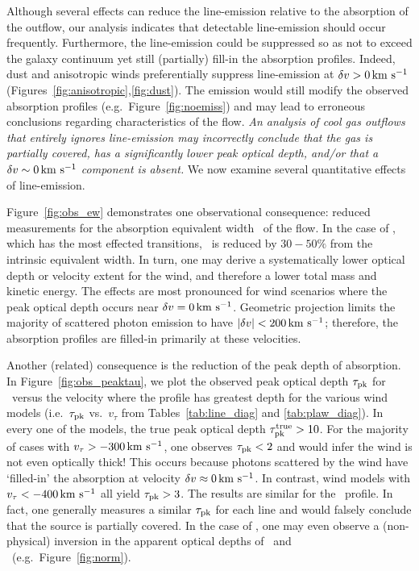 \documentclass[12pt,preprint]{aastex}
\begin{document}
Although several effects can reduce the line-emission
relative to the absorption of the outflow, our analysis
indicates that detectable line-emission should occur frequently. 
Furthermore, the line-emission could be suppressed so as not to exceed
the galaxy continuum yet still (partially) fill-in the absorption
profiles. Indeed, dust and anisotropic winds preferentially suppress
line-emission at $\delta v > 0 \, {\rm km~s^{-1}}$
(Figures~\ref{fig:anisotropic},\ref{fig:dust}).
The emission would still 
modify the observed absorption profiles (e.g.\
Figure~\ref{fig:noemiss}) and may lead to erroneous conclusions
regarding characteristics of the flow.  {\it An analysis of cool gas outflows
that entirely ignores line-emission may incorrectly conclude that the gas is
partially covered, has a significantly lower peak optical depth,
and/or that a $\delta v \sim 0 \, {\rm km~s^{-1}}$ component is
absent.}  
We now examine several quantitative effects of line-emission.

Figure~\ref{fig:obs_ew} demonstrates one observational
consequence: reduced measurements for the absorption
equivalent width \ewabs\ of the flow.  In the case of ,
which has the most effected transitions, \ewabs\ is reduced by
$30-50\%$ from the intrinsic equivalent width.  In turn, one may derive 
a systematically lower optical depth or velocity extent for the wind,
and therefore a lower total mass and kinetic energy.  
The effects are most pronounced for wind
scenarios where the peak optical depth occurs near $\delta v = 0 \, {\rm km~s^{-1}}$.
Geometric projection limits the majority of scattered photon emission to
have $|\delta v| < 200 \, {\rm km~s^{-1}}$; therefore,  the absorption profiles
are filled-in primarily at these velocities.  

Another (related) consequence is the reduction of the peak depth of 
absorption.
In Figure~\ref{fig:obs_peaktau}, we plot the observed peak optical depth
$\tau_{\rm pk}$ for \mgiia\ 
versus the velocity where the profile has greatest depth 
for the various wind models (i.e.\
$\tau_{\rm pk}$ vs.\ $v_\tau$ from Tables~\ref{tab:line_diag} and
\ref{tab:plaw_diag}).   In every one of the models, the true peak
optical depth $\tau_{\rm pk}^{\rm true} > 10$.  For the
majority of cases with $v_\tau > -300\, {\rm km~s^{-1}}$, one observes $\tau_{\rm pk} <
2$ and would infer the wind is not even optically thick!
This occurs because photons scattered by the wind have `filled-in' the
absorption at velocity $\delta v \approx 0 \, {\rm km~s^{-1}}$.  In contrast, wind
models with $v_\tau < -400 \, {\rm km~s^{-1}}$ all yield $\tau_{\rm pk} > 3$.  The
results are similar for the \mgiib\ profile.  In fact, one generally
measures a similar $\tau_{\rm pk}$ for each \ion{Mg}{2} line and would 
falsely conclude that the source is partially covered. 
In the case of \ion{Fe}{2}, one may even observe a (non-physical)
inversion in the apparent optical depths of \feiia\ and \feiib\ (e.g.\
Figure~\ref{fig:norm}). 
\end{document}
